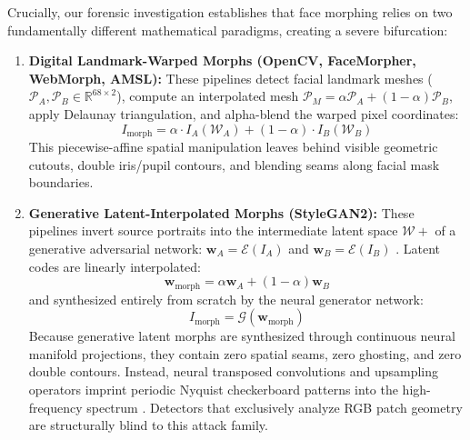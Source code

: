 \documentclass[11pt,a4paper]{article}
\begin{document}
Crucially, our forensic investigation establishes that face morphing relies on two fundamentally different mathematical paradigms, creating a severe bifurcation:
\begin{enumerate}[leftmargin=*]
    \item \textbf{Digital Landmark-Warped Morphs (OpenCV, FaceMorpher, WebMorph, AMSL):} These pipelines detect facial landmark meshes ($\mathcal{P}_A, \mathcal{P}_B \in \mathbb{R}^{68 \times 2}$), compute an interpolated mesh $\mathcal{P}_M = \alpha \mathcal{P}_A + (1-\alpha) \mathcal{P}_B$, apply Delaunay triangulation, and alpha-blend the warped pixel coordinates:
    \begin{equation}
        I_{\text{morph}} = \alpha \cdot I_A(\mathcal{W}_A) + (1-\alpha) \cdot I_B(\mathcal{W}_B)
        \label{eq:landmark_blend}
    \end{equation}
    This piecewise-affine spatial manipulation leaves behind visible geometric cutouts, double iris/pupil contours, and blending seams along facial mask boundaries.
    \item \textbf{Generative Latent-Interpolated Morphs (StyleGAN2):} These pipelines invert source portraits into the intermediate latent space $\mathcal{W}+$ of a generative adversarial network: $\mathbf{w}_A = \mathcal{E}(I_A)$ and $\mathbf{w}_B = \mathcal{E}(I_B)$ \cite{karras2020analyzing}. Latent codes are linearly interpolated:
    \begin{equation}
        \mathbf{w}_{\text{morph}} = \alpha \mathbf{w}_A + (1-\alpha) \mathbf{w}_B
        \label{eq:latent_interp}
    \end{equation}
    and synthesized entirely from scratch by the neural generator network:
    \begin{equation}
        I_{\text{morph}} = \mathcal{G}(\mathbf{w}_{\text{morph}})
        \label{eq:gan_synth}
    \end{equation}
    Because generative latent morphs are synthesized through continuous neural manifold projections, they contain zero spatial seams, zero ghosting, and zero double contours. Instead, neural transposed convolutions and upsampling operators imprint periodic Nyquist checkerboard patterns into the high-frequency spectrum \cite{frank2020leveraging, durall2020watch}. Detectors that exclusively analyze RGB patch geometry are structurally blind to this attack family.
\end{enumerate}
\end{document}
